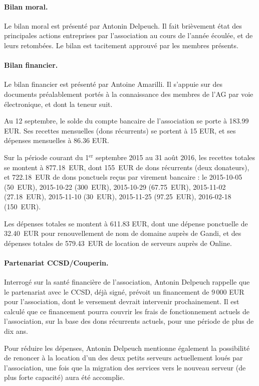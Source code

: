 \documentclass{scrartcl}
\begin{document}
\paragraph{Bilan moral.} Le bilan moral est présenté par Antonin Delpeuch. Il
fait brièvement état des principales actions entreprises par l'association au
cours de l'année écoulée, et de leurs retombées. Le bilan est tacitement
approuvé par les membres présents.

\paragraph{Bilan financier.} Le bilan financier est présenté par Antoine
Amarilli. Il s'appuie sur des documents préalablement portés à la connaissance des
membres de l'AG par voie électronique, et dont la teneur suit.

Au 12 septembre, le solde du compte bancaire de l'association se porte à 183.99 EUR. 
Ses recettes mensuelles (dons récurrents) se portent à 15 EUR, et ses dépenses
mensuelles à 86.36 EUR.

Sur la période courant du 1$^{\mathrm{er}}$ septembre 2015 au 31 août 2016, les recettes
totales se montent à 877.18~EUR, dont 155~EUR de dons récurrents (deux
donateurs), et 722.18~EUR de dons ponctuels reçus par virement bancaire : le
\mbox{2015-10-05} (50~EUR),
\mbox{2015-10-22} (300~EUR),
\mbox{2015-10-29} (67.75~EUR),
\mbox{2015-11-02} (27.18~EUR),
\mbox{2015-11-10} (30~EUR),
\mbox{2015-11-25} (97.25~EUR),
\mbox{2016-02-18} (150~EUR).

Les dépenses totales se montent à 611.83 EUR, dont une dépense ponctuelle de
32.40~EUR pour renouvellement de nom de domaine auprès de Gandi, et des dépenses
totales de 579.43~EUR de location de serveurs auprès de Online.

\paragraph{Partenariat CCSD/Couperin.} Interrogé sur la santé financière de
l'association, Antonin Delpeuch rappelle que le partenariat avec le CCSD, déjà
signé, prévoit un financement de 9\,000 EUR pour l'association, dont le
versement devrait intervenir prochainement. Il est calculé que ce financement
pourra couvrir les frais de fonctionnement actuels de l'association, sur la base
des dons récurrents actuels, pour une période de plus de dix ans.

Pour réduire les dépenses, Antonin Delpeuch mentionne également la possibilité de renoncer
à la location d'un des deux petits serveurs actuellement loués par
l'association, une fois que la migration des services vers le nouveau serveur
(de plus forte capacité) aura été accomplie.
\end{document}
